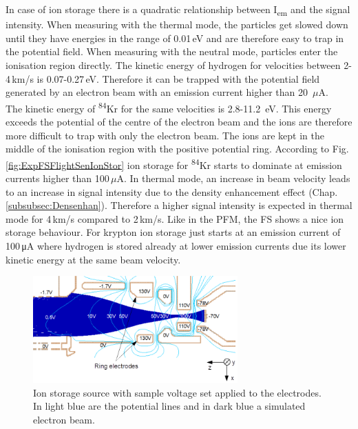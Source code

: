		
		In case of ion storage there is a quadratic relationship between I\textsubscript{em} and the signal intensity. When measuring with the thermal mode, the particles get slowed down until they have energies in the range of 0.01\,\si{\electronvolt} and are therefore easy to trap in the potential field. When measuring with the neutral mode, particles enter the ionisation region directly. The kinetic energy of hydrogen for velocities between 2-4\,km/s is 0.07-0.27\,eV. Therefore it can be trapped with the potential field generated by an electron beam with an emission current higher than 20~$\mu$A.\\
		The kinetic energy of \textsuperscript{84}Kr for the same velocities is 2.8-11.2~eV. This energy exceeds the potential of the centre of the electron beam and the ions are therefore more difficult to trap with only the electron beam. The ions are kept in the middle of the ionisation region with the positive potential ring. According to Fig.\,\ref{fig:ExpFSFlightSenIonStor} ion storage for \textsuperscript{84}Kr starts to dominate at emission currents higher than 100\,$\mu$A. In thermal mode, an increase in beam velocity leads to an increase in signal intensity due to the density enhancement effect (Chap.\,\ref{subsubsec:Densenhan}). Therefore a higher signal intensity is expected in thermal mode for 4\,km/s compared to 2\,km/s. Like in the PFM, the FS shows a nice ion storage behaviour. For krypton ion storage just starts at an emission current of 100\,\si{\micro\ampere} where hydrogen is stored already at lower emission currents due its lower kinetic energy at the same beam velocity.\\
		\begin{figure}[h]
			\centering
			\includegraphics[width = 0.7\textwidth]{Experiments/FiL_IS_elBeam_Storage.png}
			\caption{Ion storage source with sample voltage set applied to the electrodes. In light blue are the potential lines and in dark blue a simulated electron beam.}
			\label{fig:ExpFSFlightSenIonStorIS}
		\end{figure}
